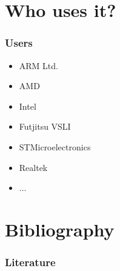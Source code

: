 \documentclass{beamer}
\begin{document}
\section{Who uses it?}
\begin{frame}\frametitle{Users} 
    \begin{itemize}
      \item{ARM Ltd.}
      \item{AMD}
      \item{Intel}
      \item{Futjitsu VSLI}
      \item{STMicroelectronics}
      \item{Realtek}
      \item{...}
    \end{itemize}
\end{frame}
      
\section{Bibliography}
\nocite{haubelt2010digitale}
\begin{frame}\frametitle{Literature} 


\end{frame}
\end{document}
